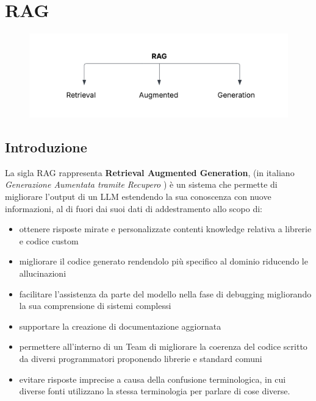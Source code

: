 \documentclass[12pt,a4paper,openright,twoside]{book}
\begin{document}
\chapter{RAG}
\begin{figure}[h]
    \raggedright
    \includegraphics[width=0.8\linewidth]{figures/RAGDefinizione.png}
    \label{fig:significa-RAG}
\end{figure}
\section{Introduzione}
La sigla RAG rappresenta \textbf{Retrieval Augmented Generation}, (in italiano \textit{Generazione Aumentata tramite Recupero} )  è un sistema che permette di migliorare l'output di un LLM estendendo la sua conoscenza con nuove informazioni, al di fuori dai suoi dati di addestramento allo scopo di:
\begin{itemize}
    \item ottenere risposte mirate e personalizzate contenti knowledge relativa a librerie e codice custom
    \item migliorare il codice generato rendendolo più specifico al dominio riducendo le allucinazioni
    \item facilitare l'assistenza da parte del modello nella fase di debugging migliorando la sua comprensione di sistemi complessi
    \item supportare la creazione di documentazione aggiornata
    \item permettere all'interno di un Team di migliorare la coerenza del codice scritto da diversi programmatori proponendo librerie e standard comuni
    \item evitare risposte imprecise a causa della confusione terminologica, in cui diverse fonti utilizzano la stessa terminologia per parlare di cose diverse.
\end{itemize}
\end{document}
